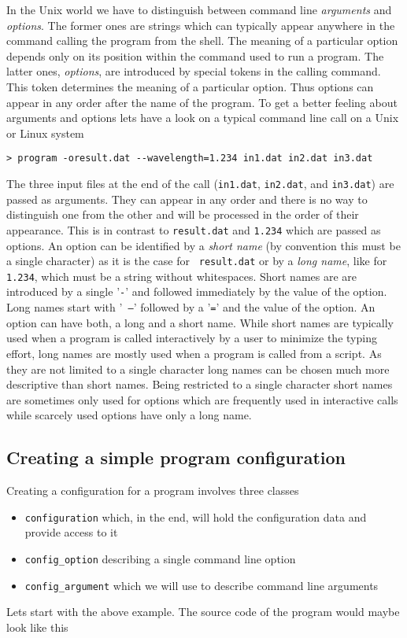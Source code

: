 In the Unix world we have to distinguish between command line {\em arguments}
and {\em options}. The former ones are strings which can typically appear
anywhere in the command calling the program from the shell. The meaning of a
particular option depends only on its position within the command used to run a
program. 
The latter ones, {\em options}, are introduced by special tokens in the calling
command. This token determines the meaning of a particular option. Thus options
can appear in any order after the name of the program. 
To get a better feeling about arguments and options lets have a look on a
typical command line call on a Unix or Linux system
\begin{verbatim}
> program -oresult.dat --wavelength=1.234 in1.dat in2.dat in3.dat
\end{verbatim}
The three input files at the end of the call ({\tt in1.dat}, {\tt in2.dat}, and
{\tt in3.dat}) are passed as arguments. They can appear in any order and there
is no way to distinguish one from the other and will be processed in the order
of their appearance. This is in contrast to {\tt result.dat} and {\tt 1.234}
which are passed as options. An option can be identified by a {\em short name} (by
convention this must be a single character) as it is the case for {\tt
result.dat} or by a {\em long name}, like for {\tt 1.234}, which must be a
string without whitespaces. Short names are are introduced by a single '{\tt -}'
and followed immediately by the value of the option. Long names start with '{\tt
--}' followed by a '{\tt =}' and the value of the option. An option can have both,
a long and a short name. While short names are typically used when a program is
called interactively by a user to minimize the typing effort, long names are
mostly used when a program is called from a script. As they are not limited to a
single character long names can be chosen much more descriptive than short
names. Being restricted to a single character short names are sometimes only
used for options which are frequently used in interactive calls while scarcely
used options have only a long name.

\subsection{Creating a simple program configuration}

Creating a configuration for a program involves three classes
\begin{itemize}
\item {\tt configuration} which, in the end, will hold the configuration data
and provide access to it
\item {\tt config\_option} describing a single command line option
\item {\tt config\_argument} which we will use to describe command line arguments 
\end{itemize}
Lets start with the above example. The source code of the program would maybe
look like this

